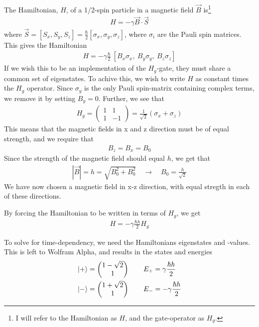 \documentclass[12p,a4paper]{article}
\newcommand{\0}{\ket{0}}
\newcommand{\1}{\ket{1}}
\begin{document}
The Hamiltonian, $H$, of a 1/2-spin particle in a magnetic field $\vec{B}$ is\footnote{I will refer to the Hamiltonian as $H$, and the gate-operator as $H_g$.}
\begin{align*}
    H = -\gamma \vec{B}\cdot \vec{S}
\end{align*}
where $\vec{S} = [S_x, S_y, S_z] = \frac{\hbar}{2}[\sigma_x, \sigma_y, \sigma_z]$, where $\sigma_i$ are the Pauli spin matrices. This gives the Hamiltonian
\begin{align*}
    H = -\gamma \frac{\hbar}{2}\ [B_x \sigma_x,\ B_y \sigma_y,\ B_z \sigma_z]
\end{align*}
If we wish this to be an implementation of the $H_g$-gate, they must share a common set of eigenstates. To achive this, we wish to write $H$ as constant times the $H_g$ operator. Since $\sigma_y$ is the only Pauli spin-matrix containing complex terms, we remove it by setting $B_y = 0$. Further, we see that
\begin{align*}
    H_g = \begin{pmatrix} 1 & 1 \\ 1 & -1 \end{pmatrix} = \frac{1}{\sqrt{2}}(\sigma_x + \sigma_z)
\end{align*}
This means that the magnetic fields in x and z direction must be of equal strength, and we require that
\begin{align*}
    B_z = B_x = B_0
\end{align*}
Since the strength of the magnetic field should equal $h$, we get that
\begin{align*}
    |\vec{B}| = h = \sqrt{B_0^2 + B_0^2} \quad \rightarrow \quad B_0 = \frac{h}{\sqrt{2}}
\end{align*}
We have now chosen a magnetic field in x-z direction, with equal stregth in each of these directions.

By forcing the Hamiltonian to be written in terms of $H_g$, we get
\begin{align*}
    H = -\gamma \frac{\hbar h}{2} H_g
\end{align*}

To solve for time-dependency, we need the Hamiltonians eigenstates and -values. This is left to Wolfram Alpha, and results in the states and energies
\begin{align*}
    \ket{+} &= \begin{pmatrix} 1 - \sqrt{2} \\ 1 \end{pmatrix}\quad\quad E_+ = \gamma\frac{\hbar h}{2} \\
    \ket{-} &= \begin{pmatrix} 1 + \sqrt{2} \\ 1 \end{pmatrix}\quad\quad E_- = -\gamma\frac{\hbar h}{2}
\end{align*}
\end{document}
